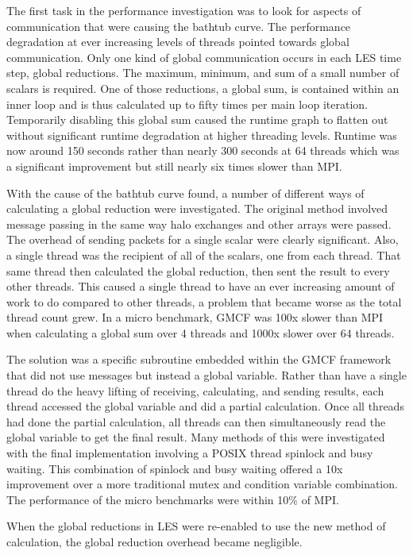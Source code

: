 The first task in the performance investigation was to look for aspects of
communication that were causing the bathtub curve. The performance degradation
at ever increasing levels of threads pointed towards global communication. Only
one kind of global communication occurs in each LES time step, global
reductions. The maximum, minimum, and sum of a small number of scalars is
required. One of those reductions, a global sum, is contained within an inner
loop and is thus calculated up to fifty times per main loop iteration.
Temporarily disabling this global sum caused the runtime graph to flatten out
without significant runtime degradation at higher threading levels. Runtime was
now around 150 seconds rather than nearly 300 seconds at 64 threads which was a
significant improvement but still nearly six times slower than MPI.

With the cause of the bathtub curve found, a number of different ways of
calculating a global reduction were investigated. The original method involved
message passing in the same way halo exchanges and other arrays were passed. The
overhead of sending packets for a single scalar were clearly significant. Also,
a single thread was the recipient of all of the scalars, one from each thread.
That same thread then calculated the global reduction, then sent the result to
every other threads. This caused a single thread to have an ever increasing
amount of work to do compared to other threads, a problem that became worse as
the total thread count grew. In a micro benchmark, GMCF was 100x slower than MPI
when calculating a global sum over 4 threads and 1000x slower over 64 threads.

The solution was a specific subroutine embedded within the GMCF framework that
did not use messages but instead a global variable. Rather than have a single
thread do the heavy lifting of receiving, calculating, and sending results, each
thread accessed the global variable and did a partial calculation. Once all
threads had done the partial calculation, all threads can then simultaneously
read the global variable to get the final result. Many methods of this were
investigated with the final implementation involving a POSIX thread spinlock and
busy waiting. This combination of spinlock and busy waiting offered a 10x
improvement over a more traditional mutex and condition variable combination.
The performance of the micro benchmarks were within 10\% of MPI.

When the global reductions in LES were re-enabled to use the new method of
calculation, the global reduction overhead became negligible.

